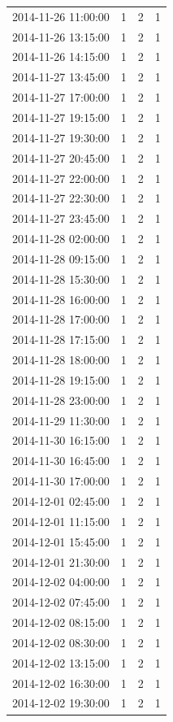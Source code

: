 \begin{tabular}{lrrr}
2014-11-26 11:00:00 & 1 & 2 & 1 \\
2014-11-26 13:15:00 & 1 & 2 & 1 \\
2014-11-26 14:15:00 & 1 & 2 & 1 \\
2014-11-27 13:45:00 & 1 & 2 & 1 \\
2014-11-27 17:00:00 & 1 & 2 & 1 \\
2014-11-27 19:15:00 & 1 & 2 & 1 \\
2014-11-27 19:30:00 & 1 & 2 & 1 \\
2014-11-27 20:45:00 & 1 & 2 & 1 \\
2014-11-27 22:00:00 & 1 & 2 & 1 \\
2014-11-27 22:30:00 & 1 & 2 & 1 \\
2014-11-27 23:45:00 & 1 & 2 & 1 \\
2014-11-28 02:00:00 & 1 & 2 & 1 \\
2014-11-28 09:15:00 & 1 & 2 & 1 \\
2014-11-28 15:30:00 & 1 & 2 & 1 \\
2014-11-28 16:00:00 & 1 & 2 & 1 \\
2014-11-28 17:00:00 & 1 & 2 & 1 \\
2014-11-28 17:15:00 & 1 & 2 & 1 \\
2014-11-28 18:00:00 & 1 & 2 & 1 \\
2014-11-28 19:15:00 & 1 & 2 & 1 \\
2014-11-28 23:00:00 & 1 & 2 & 1 \\
2014-11-29 11:30:00 & 1 & 2 & 1 \\
2014-11-30 16:15:00 & 1 & 2 & 1 \\
2014-11-30 16:45:00 & 1 & 2 & 1 \\
2014-11-30 17:00:00 & 1 & 2 & 1 \\
2014-12-01 02:45:00 & 1 & 2 & 1 \\
2014-12-01 11:15:00 & 1 & 2 & 1 \\
2014-12-01 15:45:00 & 1 & 2 & 1 \\
2014-12-01 21:30:00 & 1 & 2 & 1 \\
2014-12-02 04:00:00 & 1 & 2 & 1 \\
2014-12-02 07:45:00 & 1 & 2 & 1 \\
2014-12-02 08:15:00 & 1 & 2 & 1 \\
2014-12-02 08:30:00 & 1 & 2 & 1 \\
2014-12-02 13:15:00 & 1 & 2 & 1 \\
2014-12-02 16:30:00 & 1 & 2 & 1 \\
2014-12-02 19:30:00 & 1 & 2 & 1 \\

\end{tabular}
